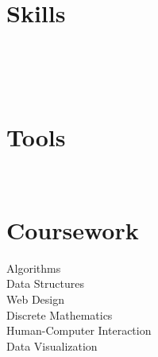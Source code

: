 \documentclass[]{deedy-resume-openfont}
\begin{document}
\begin{minipage}[t]{0.33\textwidth}

\section{Skills}
 \hspace{2mm}  \hspace{2mm}  \\ 
\vspace{4mm}
 \hspace{2mm}  \hspace{2.5mm}  \\
\vspace{4mm}
 \hspace{2mm}  \hspace{2mm}  \hspace{2.5mm}  \hspace{2mm}  \\
\sectionsep
\sectionsepextra


\section{Tools}
 \hspace{2mm}  \hspace{2.5mm}   \\ 
\vspace{4mm}
 \hspace{1mm}  \hspace{2.5mm} 
\sectionsep
\sectionsepextra


\section{Coursework}
Algorithms \\
Data Structures \\
Web Design \\
Discrete Mathematics \\
Human-Computer Interaction\\
Data Visualization \\
\sectionsep



\end{minipage}
\end{document}

